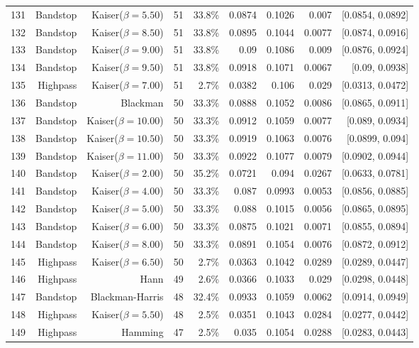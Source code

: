 \begin{longtable}{lrrrrrrrr}
    131 & Bandstop & Kaiser($\beta=5.50$) & 51 & 33.8\% & 0.0874 & 0.1026 & 0.007 & [0.0854, 0.0892] \\
    132 & Bandstop & Kaiser($\beta=8.50$) & 51 & 33.8\% & 0.0895 & 0.1044 & 0.0077 & [0.0874, 0.0916] \\
    133 & Bandstop & Kaiser($\beta=9.00$) & 51 & 33.8\% & 0.09 & 0.1086 & 0.009 & [0.0876, 0.0924] \\
    134 & Bandstop & Kaiser($\beta=9.50$) & 51 & 33.8\% & 0.0918 & 0.1071 & 0.0067 & [0.09, 0.0938] \\
    135 & Highpass & Kaiser($\beta=7.00$) & 51 & 2.7\% & 0.0382 & 0.106 & 0.029 & [0.0313, 0.0472] \\
    136 & Bandstop & Blackman & 50 & 33.3\% & 0.0888 & 0.1052 & 0.0086 & [0.0865, 0.0911] \\
    137 & Bandstop & Kaiser($\beta=10.00$) & 50 & 33.3\% & 0.0912 & 0.1059 & 0.0077 & [0.089, 0.0934] \\
    138 & Bandstop & Kaiser($\beta=10.50$) & 50 & 33.3\% & 0.0919 & 0.1063 & 0.0076 & [0.0899, 0.094] \\
    139 & Bandstop & Kaiser($\beta=11.00$) & 50 & 33.3\% & 0.0922 & 0.1077 & 0.0079 & [0.0902, 0.0944] \\
    140 & Bandstop & Kaiser($\beta=2.00$) & 50 & 35.2\% & 0.0721 & 0.094 & 0.0267 & [0.0633, 0.0781] \\
    141 & Bandstop & Kaiser($\beta=4.00$) & 50 & 33.3\% & 0.087 & 0.0993 & 0.0053 & [0.0856, 0.0885] \\
    142 & Bandstop & Kaiser($\beta=5.00$) & 50 & 33.3\% & 0.088 & 0.1015 & 0.0056 & [0.0865, 0.0895] \\
    143 & Bandstop & Kaiser($\beta=6.00$) & 50 & 33.3\% & 0.0875 & 0.1021 & 0.0071 & [0.0855, 0.0894] \\
    144 & Bandstop & Kaiser($\beta=8.00$) & 50 & 33.3\% & 0.0891 & 0.1054 & 0.0076 & [0.0872, 0.0912] \\
    145 & Highpass & Kaiser($\beta=6.50$) & 50 & 2.7\% & 0.0363 & 0.1042 & 0.0289 & [0.0289, 0.0447] \\
    146 & Highpass & Hann & 49 & 2.6\% & 0.0366 & 0.1033 & 0.029 & [0.0298, 0.0448] \\
    147 & Bandstop & Blackman-Harris & 48 & 32.4\% & 0.0933 & 0.1059 & 0.0062 & [0.0914, 0.0949] \\
    148 & Highpass & Kaiser($\beta=5.50$) & 48 & 2.5\% & 0.0351 & 0.1043 & 0.0284 & [0.0277, 0.0442] \\
    149 & Highpass & Hamming & 47 & 2.5\% & 0.035 & 0.1054 & 0.0288 & [0.0283, 0.0443] \\

\end{longtable}
